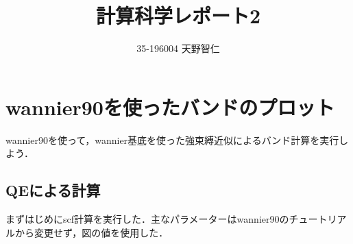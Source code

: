 \documentclass[a4j]{jarticle}
\title{計算科学レポート2}
\author{35-196004 天野智仁}
\date{}
\begin{document}
\maketitle





\section{wannier90を使ったバンドのプロット}
wannier90を使って，wannier基底を使った強束縛近似によるバンド計算を実行しよう．


  \subsection{QEによる計算}
  まずはじめにscf計算を実行した．主なパラメーターはwannier90のチュートリアルから変更せず，図の値を使用した．
\end{document}
